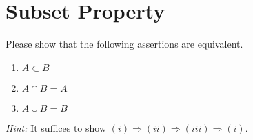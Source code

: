 \section{Subset Property}
Please show that the following assertions are equivalent.
	\begin{enumerate}
		\item $A \subset B$
		\item $A \cap B = A$
		\item $A \cup B = B$
	\end{enumerate}
	\textit{Hint: }It suffices to show $(i) \Rightarrow (ii) \Rightarrow (iii) \Rightarrow (i)$.